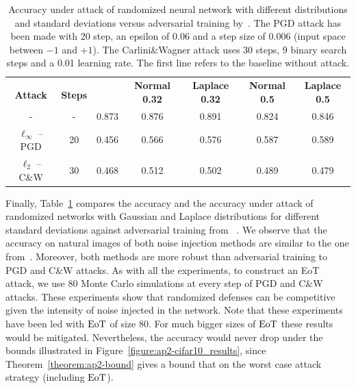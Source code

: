 \begin{table}[t]
  \caption{Accuracy under attack of randomized neural network with different distributions and standard deviations versus adversarial training by~\citet{madry2018towards}. The PGD attack has been made with 20 step, an epsilon of 0.06 and a step size of 0.006 (input space between $-1$ and $+1$). The Carlini\&Wagner attack uses 30 steps, 9 binary search steps and a 0.01 learning rate. The first line refers to the baseline without attack.}
  \label{Results}
  \centering
  \begin{tabular}{ccccccc}
    \toprule
      & & \multirow{2}[0]{*}{\citet{madry2018towards}} & \multirow{2}[0]{*}{\textbf{Normal 0.32}} & \multirow{2}[0]{*}{\textbf{Laplace 0.32}} & \multirow{2}[0]{*}{\textbf{Normal 0.5}} & \multirow{2}[0]{*}{\textbf{Laplace 0.5}} \\
     \textbf{Attack} & \textbf{Steps} & & & \\
    \midrule
    -  & - & 0.873 & 0.876 & 0.891 & 0.824 & 0.846 \\ 
    $\ell_\infty$ -- PGD & 20 & 0.456 & 0.566 & 0.576 & 0.587 & 0.589 \\
    $\ell_2$ -- C\&W & 30 & 0.468 & 0.512 & 0.502 & 0.489 & 0.479 \\
    \bottomrule
  \end{tabular}
  \label{table:madry_vs_random}
\end{table}

Finally, Table~\ref{table:madry_vs_random} compares the accuracy and the accuracy under attack of randomized networks with Gaussian and Laplace distributions for different standard deviations against adversarial training from ~\citet{madry2018towards}.
We observe that the accuracy on natural images of both noise injection methods are similar to the one from~\cite{madry2018towards}.
Moreover, both methods are more robust than adversarial training to PGD and C\&W attacks.
As with all the experiments, to construct an EoT attack,  we use 80 Monte Carlo simulations at every step of PGD and C\&W attacks.
These experiments show that randomized defenses can be competitive given the intensity of noise injected in the network.
Note that these experiments have been led with $\operatorname*{EoT}$ of size 80.
For much bigger sizes of $\operatorname*{EoT}$ these results would be mitigated.
Nevertheless, the accuracy would never drop under the bounds illustrated in Figure~\ref{figure:ap2-cifar10_results}, since Theorem~\ref{theorem:ap2-bound} gives a bound that on the worst case attack strategy (including $\operatorname*{EoT}$).

